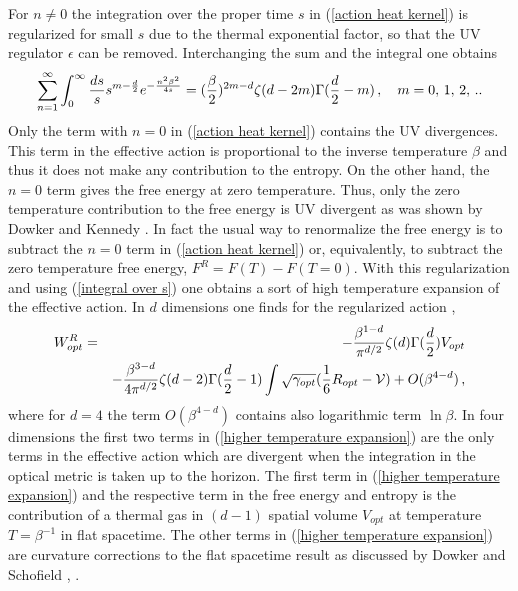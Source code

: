 \documentclass[12pt]{article}
\def\be{\begin{eqnarray}}
\def\ee{\end{eqnarray}}
\def\lb{\label}
\def\o{\over}
\begin{document}
For $n\neq 0$ the integration over the proper time $s$ in (\ref{action heat kernel}) is regularized for small $s$ due to the thermal exponential factor,    so that the UV regulator
$\epsilon$ can be removed. Interchanging the sum and the integral one obtains
\be
\sum_{n=1}^\infty \int_0^\infty {ds\o s}s^{m-{d\o 2}} e^{-{n^2\beta^2\o 4s}}=({\beta\o 2})^{2m-d}\zeta(d-2m)\Gamma({d\o 2}-m)\, , \ \ \  m=0,\, 1,\, 2,\, ..
\lb{integral over s}
\ee
Only the term with $n=0$ in   (\ref{action heat kernel}) contains the UV divergences. This term in the effective action is proportional to the inverse  temperature $\beta$ and thus
it does not make any contribution to the  entropy. On the other hand, the $n=0$ term gives the free energy at zero temperature. Thus, only the zero temperature contribution to the free energy is UV divergent as was shown by Dowker and Kennedy \cite{Dowker:1978md}. In fact the usual way    to renormalize the free energy is to subtract the $n=0$ term in (\ref{action heat kernel}) or, equivalently, to subtract the zero temperature free energy, $F^R=F(T)-F(T=0)$.      
  With this regularization and using (\ref{integral over s}) one obtains a sort of high temperature expansion of the effective action. In $d$ dimensions one finds for the regularized action \cite{Dowker:1988jw}, \cite{Dowker:1989gp}
  \be
  W^R_{opt}&=&-{\beta^{1-d}\o \pi^{d/2}}\zeta(d)\Gamma ({d\o 2})V_{opt}\nonumber\\&&-{\beta^{3-d}\o 4\pi^{d/2}}\zeta (d-2)\Gamma({d\o 2}-1)\int\sqrt{\gamma_{opt}}({1\o 6}R_{opt}-{\cal V})+O(\beta^{4-d})\, ,
  \lb{higher temperature expansion}
  \ee                          
 where for $d=4$ the term $O(\beta^{4-d})$ contains also logarithmic term $\ln\beta$.  In four dimensions the first two terms in (\ref{higher temperature expansion}) are the only terms in the effective action which are divergent when the integration in the optical metric is taken up to the horizon. The first term in (\ref{higher temperature expansion}) and the respective term in the free energy and entropy is the contribution of a thermal gas in $(d-1)$ spatial volume $V_{opt}$ at temperature $T=\beta^{-1}$ in flat spacetime. The other terms in (\ref{higher temperature expansion}) are curvature corrections to the flat spacetime result as discussed by Dowker and Schofield \cite{Dowker:1988jw}, \cite{Dowker:1989gp}.
 
\end{document}
